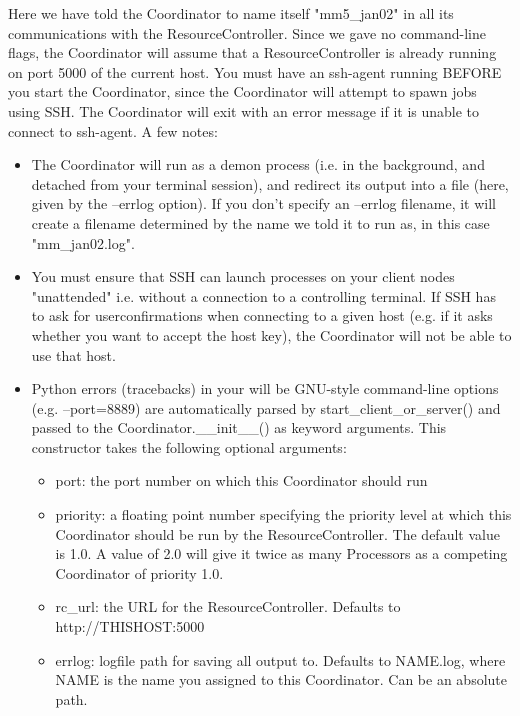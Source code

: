 \documentclass{howto}
\begin{document}
Here we have told the Coordinator to name itself "mm5_jan02" in all its communications with the ResourceController.  Since we gave no command-line flags, the Coordinator will assume that a ResourceController is already running on port 5000 of the current host.    You must have an ssh-agent running BEFORE you start the Coordinator, since the Coordinator will attempt to spawn jobs using SSH.  The Coordinator will exit with an error message if it is unable to connect to ssh-agent.  A few notes:

\begin{itemize}

\item
The Coordinator will run as a demon process (i.e. in the background, and detached from your terminal session), and redirect its  output into a file (here, given by the --errlog option). If you don't specify an --errlog filename, it will create a filename determined by the name we told it to run as, in this case "mm_jan02.log".  

\item
You must ensure that SSH can launch processes on your client nodes "unattended" i.e. without a connection to a controlling terminal.  If SSH has to ask for userconfirmations when connecting to a given host (e.g. if it asks whether you want to accept the host key), the Coordinator will not be able to use that host.

\item
Python errors (tracebacks) in your will be GNU-style command-line options (e.g. --port=8889) are automatically parsed by start_client_or_server() and passed to the Coordinator.__init__() as keyword arguments.  This constructor takes the following optional arguments: 
    \begin{itemize}
    \item
    port: the port number on which this Coordinator should run
    
    \item
    priority: a floating point number specifying the priority level at which this Coordinator should be run by the ResourceController.  The default value is 1.0.  A value of 2.0 will give it twice as many Processors as a competing Coordinator of priority 1.0.

    \item
    rc_url: the URL for the ResourceController.  Defaults to http://THISHOST:5000
    \item
    errlog: logfile path for saving all output to.  Defaults to NAME.log, where NAME is the name you assigned to this Coordinator. Can be an absolute path.


\end{itemize}
\end{itemize}
\end{document}

